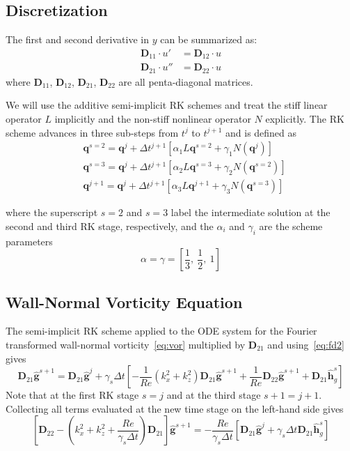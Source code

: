 \documentclass[titlepage,12pt,letter]{article}
\newcommand{\bracket}[1]{\left[ #1 \right]}
\newcommand{\re}{Re}
\numberwithin{equation}{section}
\begin{document}
\subsection{Discretization}
The first and second derivative in $y$ can be summarized as:
\begin{align}
	\bm{D}_{11} \cdot u' &= \bm{D}_{12} \cdot u \label{eq:fd1}\\
	\bm{D}_{21} \cdot u'' &= \bm{D}_{22} \cdot u \label{eq:fd2}
\end{align}
where $\bm{D}_{11}$, $\bm{D}_{12}$, $\bm{D}_{21}$, $\bm{D}_{22}$ are all penta-diagonal matrices.

We will use the additive semi-implicit RK schemes and treat the stiff linear operator $L$ implicitly and the non-stiff nonlinear operator $N$ explicitly. The RK scheme advances in three sub-steps from $t^{j}$ to $t^{j+1}$ and is defined as
\begin{align*}
	&\bm{q}^{s=2}=\bm{q}^{j}+\Delta t^{j+1}\left[\alpha_{1} L \bm{q}^{s=2}+\gamma_{1} N\left(\bm{q}^{j}\right)\right] \\
	&\bm{q}^{s=3}=\bm{q}^{j}+\Delta t^{j+1}\left[\alpha_{2} L \bm{q}^{s=3}+\gamma_{2} N\left(\bm{q}^{s=2}\right)\right] \\
	&\bm{q}^{j+1}=\bm{q}^{j}+\Delta t^{j+1}\left[\alpha_{3} L \bm{q}^{j+1}+\gamma_{3} N\left(\bm{q}^{s=3}\right)\right]
\end{align*}

where the superscript $s=2$ and $s=3$ label the intermediate solution at the second and third RK stage, respectively, and the $\alpha_{i}$ and $\gamma_{i}$ are the scheme parameters 
\begin{equation}
	\alpha = \gamma=\bracket{\frac{1}{3}, \ \frac{1}{2}, \ 1}
\end{equation}

\subsection{Wall-Normal Vorticity Equation}
The semi-implicit RK scheme applied to the ODE system for the Fourier transformed wall-normal vorticity~\eqref{eq:vor} multiplied by $\bm{D}_{21}$ and using~\eqref{eq:fd2} gives
\begin{equation*}
	\bm{D}_{21} \hat{\bm{g}}^{s+1}=\bm{D}_{21} \hat{\bm{g}}^{j}+\gamma_{s} \Delta t \bracket{ -\frac{1}{\re}\left(k_x^{2}+k_z^{2}\right) \bm{D}_{21} \hat{\bm{g}}^{s+1}+\frac{1}{\re} \bm{D}_{22} \hat{\bm{g}}^{s+1}+\bm{D}_{21} \hat{\bm{h}}_{g}^{s} }
\end{equation*}
Note that at the first RK stage $s=j$ and at the third stage $s+1=j+1$. Collecting all terms evaluated at the new time stage on the left-hand side gives
\begin{equation}
	\bracket{\bm{D}_{22}-\left(k_x^{2}+k_z^{2}+\frac{\re}{\gamma_{s} \Delta t}\right) \bm{D}_{21}} \hat{\bm{g}}^{s+1}=-\frac{\re}{\gamma_{s} \Delta t} \bracket{ \bm{D}_{21} \hat{\bm{g}}^{j}+\gamma_{s} \Delta t \bm{D}_{21} \hat{\bm{h}}_{g}^{s} }
\end{equation}
\end{document}
